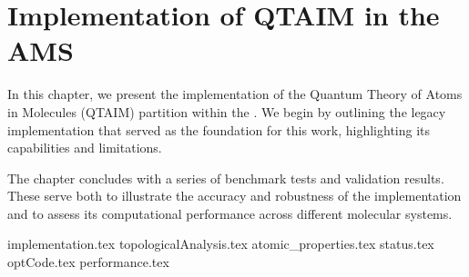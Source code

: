\chapter{Implementation of QTAIM in the AMS}

\vspace{2cm}%
In this chapter, we present the implementation of the Quantum Theory of Atoms
in Molecules (QTAIM) partition within the \ams.
We begin by outlining the legacy implementation that served as the foundation
for this work, highlighting its capabilities and limitations.

\vspace{0.7cm}%
The chapter concludes with a series of benchmark tests and validation results.
These serve both to illustrate the accuracy and robustness of the
implementation and to assess its computational performance across different
molecular systems.

{implementation.tex}
{topologicalAnalysis.tex}
{atomic_properties.tex}
{status.tex}
{optCode.tex}
{performance.tex}

